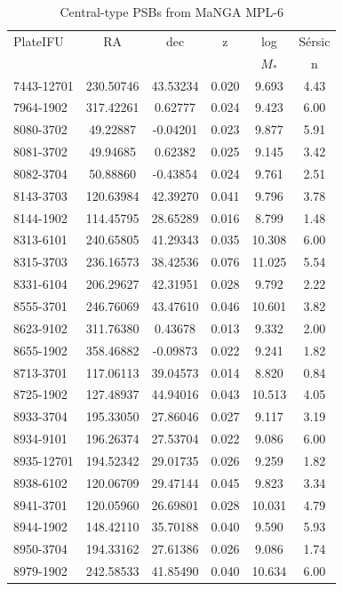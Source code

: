 \begin{table}
\caption{Central-type PSBs from MaNGA MPL-6}
\label{tab:my-CPSBs}
\begin{tabular}{lccccc}
\hline
PlateIFU & RA & dec & z & log & S\'ersic\\
& & & & $M_*$ & n \\
\hline
7443-12701 & 230.50746 & 43.53234 & 0.020 & 9.693 & 4.43 \\
7964-1902 & 317.42261 & 0.62777 & 0.024 & 9.423 & 6.00 \\
8080-3702 & 49.22887 & -0.04201 & 0.023 & 9.877 & 5.91 \\
8081-3702 & 49.94685 & 0.62382 & 0.025 & 9.145 & 3.42 \\
8082-3704 & 50.88860 & -0.43854 & 0.024 & 9.761 & 2.51 \\
8143-3703 & 120.63984 & 42.39270 & 0.041 & 9.796 & 3.78 \\
8144-1902 & 114.45795 & 28.65289 & 0.016 & 8.799 & 1.48 \\
8313-6101 & 240.65805 & 41.29343 & 0.035 & 10.308 & 6.00 \\
8315-3703 & 236.16573 & 38.42536 & 0.076 & 11.025 & 5.54 \\
8331-6104 & 206.29627 & 42.31951 & 0.028 & 9.792 & 2.22 \\
8555-3701 & 246.76069 & 43.47610 & 0.046 & 10.601 & 3.82 \\
8623-9102 & 311.76380 & 0.43678 & 0.013 & 9.332 & 2.00 \\
8655-1902 & 358.46882 & -0.09873 & 0.022 & 9.241 & 1.82 \\
8713-3701 & 117.06113 & 39.04573 & 0.014 & 8.820 & 0.84 \\
8725-1902 & 127.48937 & 44.94016 & 0.043 & 10.513 & 4.05 \\
8933-3704 & 195.33050 & 27.86046 & 0.027 & 9.117 & 3.19 \\
8934-9101 & 196.26374 & 27.53704 & 0.022 & 9.086 & 6.00 \\
8935-12701 & 194.52342 & 29.01735 & 0.026 & 9.259 & 1.82 \\
8938-6102 & 120.06709 & 29.47144 & 0.045 & 9.823 & 3.34 \\
8941-3701 & 120.05960 & 26.69801 & 0.028 & 10.031 & 4.79 \\
8944-1902 & 148.42110 & 35.70188 & 0.040 & 9.590 & 5.93 \\
8950-3704 & 194.33162 & 27.61386 & 0.026 & 9.086 & 1.74 \\
8979-1902 & 242.58533 & 41.85490 & 0.040 & 10.634 & 6.00 \\

\end{tabular}
\end{table}
